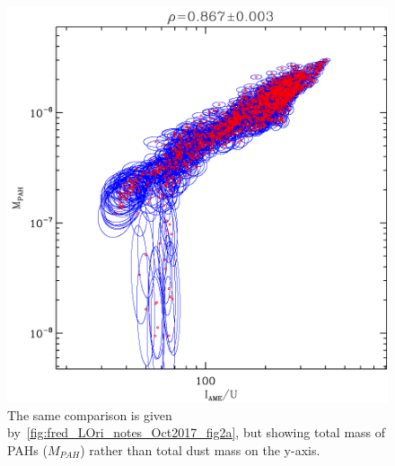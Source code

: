               \begin{figure}
                \includegraphics[width=\textwidth/2]{../Plots/ch_lori/fred_LOri_notes_Oct2017_fig2b.pdf}
                \centering
                \caption{The same comparison is given by~\ref{fig:fred_LOri_notes_Oct2017_fig2a}, but showing total mass of PAHs ($M_{PAH}$) rather than total dust mass on the y-axis. }
                \label{fig:fred_LOri_notes_Oct2017_fig2b}
              \end{figure}
